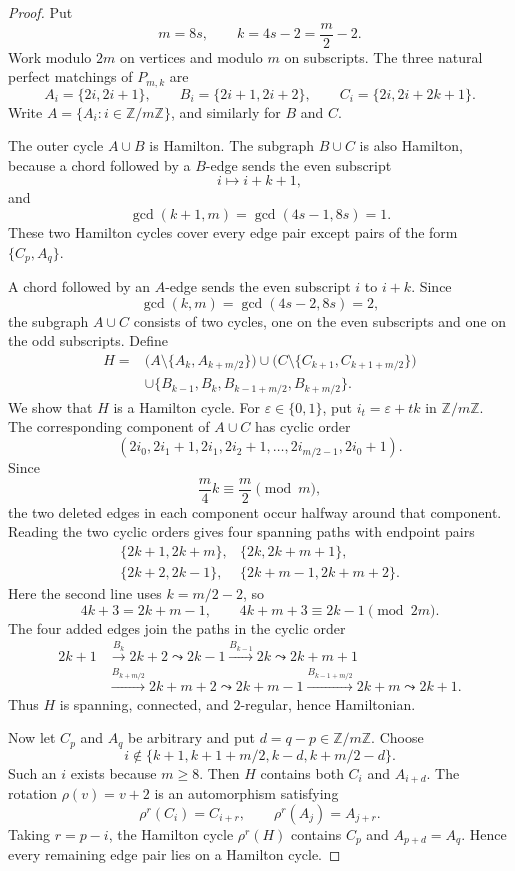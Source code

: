 \documentclass[11pt]{amsart}
\newcommand{\Z}{\mathbb{Z}}
\begin{document}
\begin{proof}
Put
\[
  m=8s,
  \qquad
  k=4s-2=\frac m2-2.
\]
Work modulo $2m$ on vertices and modulo $m$ on subscripts. The three
natural perfect matchings of $P_{m,k}$ are
\[
  A_i=\{2i,2i+1\},
  \qquad
  B_i=\{2i+1,2i+2\},
  \qquad
  C_i=\{2i,2i+2k+1\}.
\]
Write $A=\{A_i:i\in\Z/m\Z\}$, and similarly for $B$ and $C$.

The outer cycle $A\cup B$ is Hamilton. The subgraph $B\cup C$ is also
Hamilton, because a chord followed by a $B$-edge sends the even subscript
\[
  i\longmapsto i+k+1,
\]
and
\[
  \gcd(k+1,m)=\gcd(4s-1,8s)=1.
\]
These two Hamilton cycles cover every edge pair except pairs of the form
$\{C_p,A_q\}$.

A chord followed by an $A$-edge sends the even subscript $i$ to $i+k$.
Since
\[
  \gcd(k,m)=\gcd(4s-2,8s)=2,
\]
the subgraph $A\cup C$ consists of two cycles, one on the even subscripts
and one on the odd subscripts. Define
\[
\begin{split}
  H={}&\bigl(A\setminus\{A_k,A_{k+m/2}\}\bigr)
       \cup\bigl(C\setminus\{C_{k+1},C_{k+1+m/2}\}\bigr)\\
     &\cup\{B_{k-1},B_k,B_{k-1+m/2},B_{k+m/2}\}.
\end{split}
\]
We show that $H$ is a Hamilton cycle. For $\varepsilon\in\{0,1\}$,
put $i_t=\varepsilon+tk$ in $\Z/m\Z$. The corresponding component of
$A\cup C$ has cyclic order
\[
  (2i_0,2i_1+1,2i_1,2i_2+1,\ldots,
   2i_{m/2-1},2i_0+1).
\]
Since
\[
  \frac m4 k\equiv \frac m2\pmod m,
\]
the two deleted edges in each component occur halfway around that
component. Reading the two cyclic orders gives four spanning paths with
endpoint pairs
\[
\begin{array}{ll}
  \{2k+1,2k+m\}, & \{2k,2k+m+1\},\\[2pt]
  \{2k+2,2k-1\}, & \{2k+m-1,2k+m+2\}.
\end{array}
\]
Here the second line uses $k=m/2-2$, so
\[
  4k+3=2k+m-1,
  \qquad
  4k+m+3\equiv 2k-1\pmod{2m}.
\]
The four added edges join the paths in the cyclic order
\[
\begin{split}
  2k+1
  &\xrightarrow{B_k}2k+2
  \leadsto 2k-1
  \xrightarrow{B_{k-1}}2k
  \leadsto 2k+m+1\\
  &\xrightarrow{B_{k+m/2}}2k+m+2
  \leadsto 2k+m-1
  \xrightarrow{B_{k-1+m/2}}2k+m
  \leadsto 2k+1.
\end{split}
\]
Thus $H$ is spanning, connected, and $2$-regular, hence Hamiltonian.

Now let $C_p$ and $A_q$ be arbitrary and put $d=q-p\in\Z/m\Z$. Choose
\[
  i\notin
  \{k+1,k+1+m/2,k-d,k+m/2-d\}.
\]
Such an $i$ exists because $m\geq 8$. Then $H$ contains both $C_i$ and
$A_{i+d}$. The rotation $\rho(v)=v+2$ is an automorphism satisfying
\[
  \rho^r(C_i)=C_{i+r},
  \qquad
  \rho^r(A_j)=A_{j+r}.
\]
Taking $r=p-i$, the Hamilton cycle $\rho^r(H)$ contains $C_p$ and
$A_{p+d}=A_q$. Hence every remaining edge pair lies on a Hamilton cycle.
\end{proof}
\end{document}
